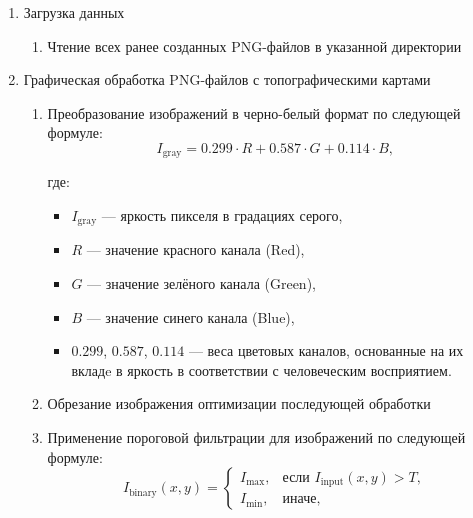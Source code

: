     \begin{enumerate}
        \item Загрузка данных
        \begin{enumerate}
            \item Чтение всех ранее созданных PNG-файлов в указанной директории
        \end{enumerate}
        \item Графическая обработка PNG-файлов с топографическими картами
        \begin{enumerate}
            \item Преобразование изображений в черно-белый формат по следующей формуле:
                \begin{equation}
                    I_{\text{gray}} = 0.299 \cdot R + 0.587 \cdot G + 0.114 \cdot B,
                    \label{eq:grayscale_conversion}
                \end{equation}
                    
                где:
                \begin{itemize}
                    \item \( I_{\text{gray}} \) — яркость пикселя в градациях серого,
                    \item \( R \) — значение красного канала (Red),
                    \item \( G \) — значение зелёного канала (Green),
                    \item \( B \) — значение синего канала (Blue),
                    \item \( 0.299 \), \( 0.587 \), \( 0.114 \) — веса цветовых каналов, основанные на их вкладe в яркость в соответствии с человеческим восприятием.
                \end{itemize}
            \item Обрезание изображения оптимизации последующей обработки
            \item Применение пороговой фильтрации для изображений по следующей формуле:
                \begin{equation}
                    I_{\text{binary}}(x, y) =
                    \begin{cases} 
                        I_{\text{max}}, & \text{если } I_{\text{input}}(x, y) > T, \\
                        I_{\text{min}}, & \text{иначе,}
                    \end{cases}
                    \label{eq:thresholding}
                \end{equation}


\end{enumerate}
\end{enumerate}
